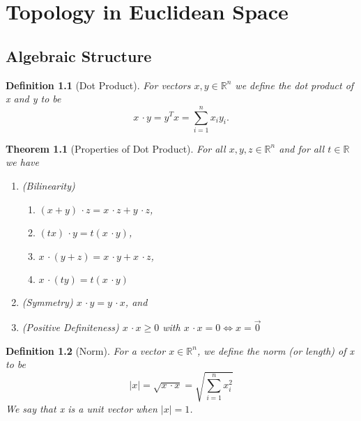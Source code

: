 \documentclass[11pt, oneside]{book}
\theoremstyle{break}
\newtheorem{thm}{Theorem}[section]
\newtheorem{defn}{Definition}[section]
\newcommand{\bb}[1]{\mathbb{#1}}			%
\newcommand{\dotp}{\, \cdotp}				%
\begin{document}
\chapter{Topology in Euclidean Space}


\section{Algebraic Structure}

\begin{defn}[Dot Product]
	For vectors $x, y \in \bb{R}^n$ we define the dot product of x and y to be
	\begin{equation*}
		x \dotp y = y^T x = \sum_{i=1}^{n} x_i y_i.
	\end{equation*}
\end{defn}

\begin{thm}[Properties of Dot Product]
	For all $x, y, z \in \bb{R}^n$ and for all $t \in \bb{R}$ we have
	\begin{enumerate}
		\item (Bilinearity) 
			\begin{enumerate}
				\item $(x + y) \dotp z = x \dotp z + y \dotp z$,
				\item $(tx) \dotp y = t (x \dotp y)$,
				\item $x \dotp (y + z) = x \dotp y + x \dotp z$,
				\item $x \dotp (ty) = t (x \dotp y)$
			\end{enumerate}
		\item (Symmetry) $x \dotp y = y \dotp x$, and
		\item (Positive Definiteness) $x \dotp x \geq 0$ with $x \dotp x = 0 \iff x = \vec{0}$
	\end{enumerate}
\end{thm}

\begin{defn}[Norm]
	For a vector $x \in \bb{R}^n$, we define the norm (or length) of x to be
	\begin{equation*}
		|x| = \sqrt{x \dotp x} = \sqrt{\sum_{i=1}^{n} x_i^2}
	\end{equation*}
	We say that x is a unit vector when $|x| = 1$.
\end{defn}
\end{document}
